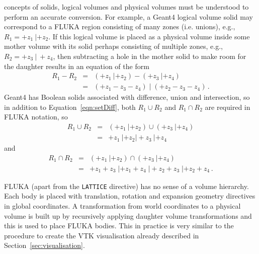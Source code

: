 \documentclass[final,5p,times,twocolumn]{elsarticle}
\newcommand{\fluka}[1]{\texttt{\MakeUppercase{#1}}}
\begin{document}
concepts of solids, logical volumes and physical volumes must be understood
to perform an accurate conversion.  For example, a Geant4 logical volume
solid may correspond to a FLUKA region consisting of many zones
(i.e. unions), e.g.,~$R_1 = +z_1\: | +z_2$.  If this logical volume is
placed as a physical volume inside some mother volume with its solid
perhaps consisting of multiple zones, e.g., $R_2= +z_3 \: |~+z_4$, then
subtracting a hole in the mother solid to make room for the daughter
results in an equation of the form
\begin{equation}
  \begin{aligned}
R_1 - R_2 	& = & (+z_1 \: | +z_2) - ( +z_3 \: | +z_4) 			\\
			& = & (+z_1 - z_3 - z_4) \;  | \; (+z_2 - z_3 - z_4)\,.
\label{eqn:setDiff}
  \end{aligned}
\end{equation}
Geant4 has Boolean solids associated with difference, union and intersection, so in addition to
Equation~\ref{eqn:setDiff}, both $R_1 \cup R_2$ and $R_1 \cap R_2$ are required in FLUKA notation, so
\begin{equation}
  \begin{aligned}
R_1 \cup R_2 	& = & (+z_1 \: | +z_2)  \cup ( +z_3 \: | +z_4) \\
			& = & +z_1 \: | +z_2 |  +z_3 \: | +z_4
\label{eqn:setUnion}
\end{aligned}
\end{equation}
and
\begin{equation}
  \begin{aligned}
    R_1 \cap R_2 	& = & (+z_1 \: | +z_2) \cap ( +z_3 \: | +z_4) \\
			& = & +z_1 +z_3  \; | +z_1 +z_4 \; | +z_2 +z_3 \; | +z_2 +z_4\,.
  \end{aligned}
\label{eqn:setIntersection}
\end{equation}

FLUKA (apart from the \fluka{lattice} directive) has no sense of a volume hierarchy. Each body is placed with
translation, rotation and expansion geometry directives in global coordinates. A transformation from world
coordinates to a physical volume is built up by recursively applying daughter volume transformations
and  this is used to place FLUKA bodies. This  in practice is very similar to the procedure to create the
VTK visualisation already described in Section~\ref{sec:visualisation}.
\end{document}
